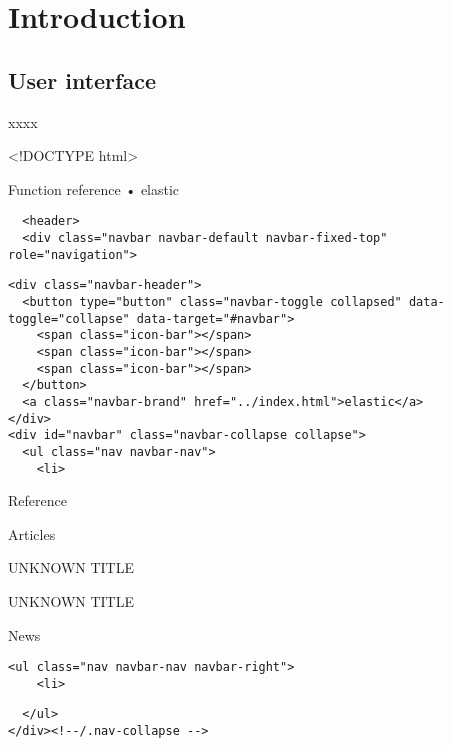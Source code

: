 \documentclass[]{article}
\title{}
\author{}
\date{}
\begin{document}
{
\setcounter{tocdepth}{2}
\tableofcontents
}
\hypertarget{intro}{%
\section{Introduction}\label{intro}}

\hypertarget{user-interface}{%
\subsection{User interface}\label{user-interface}}

xxxx

\textless{}!DOCTYPE html\textgreater{}

Function reference • elastic

\begin{verbatim}
  <header>
  <div class="navbar navbar-default navbar-fixed-top" role="navigation">
\end{verbatim}

\begin{verbatim}
<div class="navbar-header">
  <button type="button" class="navbar-toggle collapsed" data-toggle="collapse" data-target="#navbar">
    <span class="icon-bar"></span>
    <span class="icon-bar"></span>
    <span class="icon-bar"></span>
  </button>
  <a class="navbar-brand" href="../index.html">elastic</a>
</div>
<div id="navbar" class="navbar-collapse collapse">
  <ul class="nav navbar-nav">
    <li>
\end{verbatim}

 {}

Reference

 Articles

{}

UNKNOWN TITLE

UNKNOWN TITLE

News

\begin{verbatim}
<ul class="nav navbar-nav navbar-right">
    <li>
\end{verbatim}

 {}

\begin{verbatim}
  </ul>
</div><!--/.nav-collapse -->
\end{verbatim}
\end{document}
